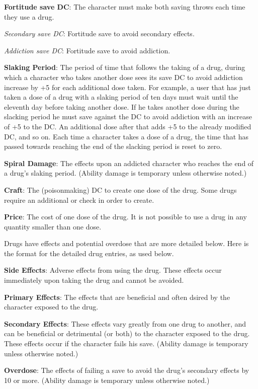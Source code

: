 \textbf{Fortitude save DC}: The character must make both saving throws each time they use a drug.

\textit{Secondary save DC}: Fortitude save to avoid secondary effects. 

\textit{Addiction save DC}: Fortitude save to avoid addiction.

\textbf{Slaking Period}: The period of time that follows the taking of a drug, during which a character who takes another dose sees its save DC to avoid addiction increase by +5 for each additional dose taken. For example, a user that has just taken a dose of a drug with a slaking period of ten days must wait until the eleventh day before taking another dose. If he takes another dose during the slacking period he must save against the DC to avoid addiction with an increase of +5 to the DC. An additional dose after that adds +5 to the already modified DC, and so on. Each time a character takes a dose of a drug, the time that has passed towards reaching the end of the slacking period is reset to zero.

\textbf{Spiral Damage}: The effects upon an addicted character who reaches the end of a drug's slaking period. (Ability damage is temporary unless otherwise noted.)

\textbf{Craft}: The  (poisonmaking) DC to create one dose of the drug. Some drugs require an additional  or  check in order to create.

\textbf{Price}: The cost of one dose of the drug. It is not possible to use a drug in any quantity smaller than one dose.

Drugs have effects and potential overdose that are more detailed below. Here is the format for the detailed drug entries, as used below.

\textbf{Side Effects}: Adverse effects from using the drug. These effects occur immediately upon taking the drug and cannot be avoided.

\textbf{Primary Effects}: The effects that are beneficial and often dsired by the character exposed to the drug.

\textbf{Secondary Effects}: These effects vary greatly from one drug to another, and can be beneficial or detrimental (or both) to the character exposed to the drug. These effects occur if the character fails his save. (Ability damage is temporary unless otherwise noted.)

\textbf{Overdose}: The effects of failing a save to avoid the drug's secondary effects by 10 or more. (Ability damage is temporary unless otherwise noted.)


